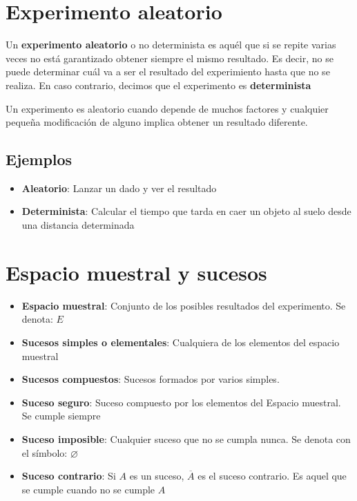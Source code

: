 
\section{Experimento aleatorio}

Un \textbf{experimento aleatorio} o no determinista es aquél que si se repite varias veces no está garantizado obtener siempre el mismo resultado. Es decir, no se puede determinar cuál va a ser el resultado del experimiento hasta que no se realiza. En caso contrario, decimos que el experimento es \textbf{determinista}

Un experimento es aleatorio cuando depende de muchos factores y cualquier pequeña modificación de alguno implica obtener un resultado diferente.

\subsection{Ejemplos}

\begin{itemize}
 \item \textbf{Aleatorio}: Lanzar un dado y ver el resultado
 \item \textbf{Determinista}: Calcular el tiempo que tarda en caer un objeto al suelo desde una distancia determinada
 \end{itemize} 
 
\section{Espacio muestral y sucesos}
\begin{itemize}
\item \textbf{Espacio muestral}: Conjunto de los posibles resultados del experimento. Se denota: $E$
\item \textbf{Sucesos simples o elementales}: Cualquiera de los elementos del espacio muestral
\item \textbf{Sucesos compuestos}: Sucesos formados por varios simples. 
\item \textbf{Suceso seguro}: Suceso compuesto por los elementos del Espacio muestral. Se cumple siempre
\item \textbf{Suceso imposible}: Cualquier suceso que no se cumpla nunca. Se denota con el símbolo: $\varnothing$
\item \textbf{Suceso contrario}: Si $A$ es un suceso, $\overline{A}$ es el suceso contrario. Es aquel que se cumple cuando no se cumple $A$
\end{itemize}

